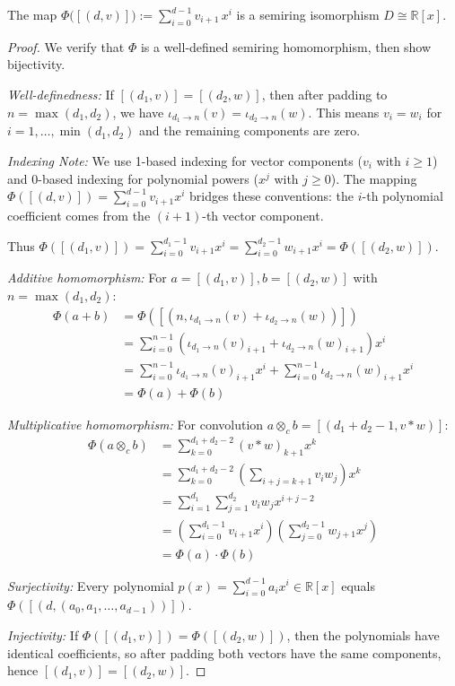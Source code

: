 \begin{theorem}\label{thm:polyIso}
The map \(\Phi\bigl([(d,v)]\bigr):=\sum_{i=0}^{d-1} v_{i+1}\,x^{i}\) is a semiring isomorphism \(D\cong\mathbb R[x]\).
\end{theorem}
\begin{proof}
We verify that $\Phi$ is a well-defined semiring homomorphism, then show bijectivity.

\textit{Well-definedness:}
If $[(d_1,v)] = [(d_2,w)]$, then after padding to $n = \max(d_1,d_2)$, we have $\iota_{d_1 \to n}(v) = \iota_{d_2 \to n}(w)$. This means $v_i = w_i$ for $i = 1,\ldots,\min(d_1,d_2)$ and the remaining components are zero. 

\textit{Indexing Note:} We use 1-based indexing for vector components ($v_i$ with $i \geq 1$) and 0-based indexing for polynomial powers ($x^j$ with $j \geq 0$). The mapping $\Phi([(d,v)]) = \sum_{i=0}^{d-1} v_{i+1} x^i$ bridges these conventions: the $i$-th polynomial coefficient comes from the $(i+1)$-th vector component.

Thus $\Phi([(d_1,v)]) = \sum_{i=0}^{d_1-1} v_{i+1} x^i = \sum_{i=0}^{d_2-1} w_{i+1} x^i = \Phi([(d_2,w)])$.

\textit{Additive homomorphism:}
For $a = [(d_1,v)], b = [(d_2,w)]$ with $n = \max(d_1,d_2)$:
\begin{align}
\Phi(a + b) &= \Phi([(n, \iota_{d_1 \to n}(v) + \iota_{d_2 \to n}(w))]) \\
&= \sum_{i=0}^{n-1} (\iota_{d_1 \to n}(v)_{i+1} + \iota_{d_2 \to n}(w)_{i+1}) x^i \\
&= \sum_{i=0}^{n-1} \iota_{d_1 \to n}(v)_{i+1} x^i + \sum_{i=0}^{n-1} \iota_{d_2 \to n}(w)_{i+1} x^i \\
&= \Phi(a) + \Phi(b)
\end{align}

\textit{Multiplicative homomorphism:}
For convolution $a \otimes_c b = [(d_1+d_2-1, v \ast w)] $:
\begin{align}
\Phi(a \otimes_c b) &= \sum_{k=0}^{d_1+d_2-2} (v \ast w)_{k+1} x^k \\
&= \sum_{k=0}^{d_1+d_2-2} \left(\sum_{i+j=k+1} v_i w_j\right) x^k \\
&= \sum_{i=1}^{d_1} \sum_{j=1}^{d_2} v_i w_j x^{i+j-2} \\
&= \left(\sum_{i=0}^{d_1-1} v_{i+1} x^i\right)\left(\sum_{j=0}^{d_2-1} w_{j+1} x^j\right) \\
&= \Phi(a) \cdot \Phi(b)
\end{align}

\textit{Surjectivity:}
Every polynomial $p(x) = \sum_{i=0}^{d-1} a_i x^i \in \mathbb{R}[x]$ equals $\Phi([(d, (a_0, a_1, \ldots, a_{d-1}))])$.

\textit{Injectivity:}
If $\Phi([(d_1,v)]) = \Phi([(d_2,w)])$, then the polynomials have identical coefficients, so after padding both vectors have the same components, hence $[(d_1,v)] = [(d_2,w)]$.
\end{proof}


